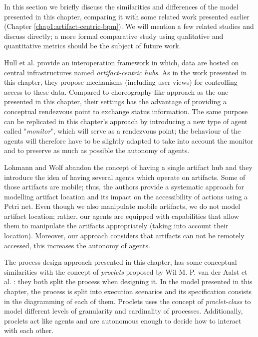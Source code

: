 \label{chap3:sec:discussion}

In this section we briefly discuss the similarities and differences of the model presented in this chapter, comparing it with some related work presented earlier (Chapter \ref{chap1:artifact-centric-bpm}). We will mention a few related studies and discuss directly; a more formal comparative study using qualitative and quantitative metrics should be the subject of future work.

Hull et al. \citeyearpar{hull2009facilitating} provide an interoperation framework in which, data are hosted on central infrastructures named \textit{artifact-centric hubs}. As in the work presented in this chapter, they propose mechanisms (including user views) for controlling access to these data. Compared to choreography-like approach as the one presented in this chapter, their settings has the advantage of providing a conceptual rendezvous point to exchange status information. The same purpose can be replicated in this chapter's approach by introducing a new type of agent called "\textit{monitor}", which will serve as a rendezvous point; the behaviour of the agents will therefore have to be slightly adapted to take into account the monitor and to preserve as much as possible the autonomy of agents.

Lohmann and Wolf \citeyearpar{lohmann2010artifact} abandon the concept of having a single artifact hub \cite{hull2009facilitating} and they introduce the idea of having several agents which operate on artifacts. Some of those artifacts are mobile; thus, the authors provide a systematic approach for modelling artifact location and its impact on the accessibility of actions using a Petri net. Even though we also manipulate mobile artifacts, we do not model artifact location; rather, our agents are equipped with capabilities that allow them to manipulate the artifacts appropriately (taking into account their location). Moreover, our approach considers that artifacts can not be remotely accessed, this increases the autonomy of agents.

The process design approach presented in this chapter, has some conceptual similarities with the concept of \textit{proclets} proposed by Wil M. P. van der Aalst et al. \citeyearpar{van2001proclets, van2009workflow}: they both split the process when designing it. In the model presented in this chapter, the process is split into execution scenarios and its specification consists in the diagramming of each of them. Proclets \cite{van2001proclets, van2009workflow} uses the concept of \textit{proclet-class} to model different levels of granularity and cardinality of processes. Additionally, proclets act like agents and are autonomous enough to decide how to interact with each other.

